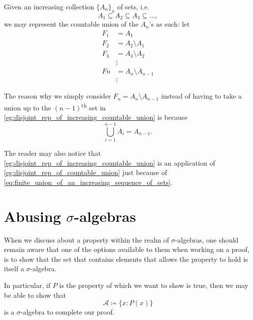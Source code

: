 \documentclass[notoc,notitlepage]{tufte-book}
\begin{document}
\begin{eg}\label{eg:disjoint_rep_of_increasing_countable_union}
  Given an increasing collection $\{ A_n \}_{n}$ of sets, i.e.
  \begin{equation*}
    A_1 \subseteq A_2 \subseteq A_3 \subseteq \hdots,
  \end{equation*}
  we may represent the countable union of the $A_n$'s as such:
  let
  \begin{align*}
    F_1 &= A_1 \\
    F_2 &= A_2 \setminus A_1 \\
    F_3 &= A_3 \setminus A_2 \\
        &\vdots \\
    Fn &= A_n \setminus A_{n-1} \\
       &\vdots
  \end{align*}
\end{eg}

\begin{remark}
  The reason why we simply consider $F_n = A_n \setminus A_{n-1}$ instead
  of having to take a union up to the $(n-1)$\textsuperscript{th}
  set in \cref{eg:disjoint_rep_of_increasing_countable_union}
  is because
  \begin{equation}\label{eq:finite_union_of_an_increasing_sequence_of_sets}
    \bigcup_{i=1}^{n-1} A_i = A_{n-1}.
  \end{equation}

  The reader may also notice that
  \cref{eg:disjoint_rep_of_increasing_countable_union}
  is an application of \cref{eg:disjoint_rep_of_countable_union}
  just because of \cref{eq:finite_union_of_an_increasing_sequence_of_sets}.
\end{remark}

\section{Abusing \texorpdfstring{$\sigma$}{sigma}-algebras}%
\label{sec:abusing_sigma_algebras}

When we discuss about a property within the realm of $\sigma$-algebras,
one should remain aware that one of the options available to them
when working on a proof, is to show that the set that contains elements
that allows the property to hold is itself a $\sigma$-algebra.

In particular, if $P$ is the property of which we want to show is true,
then we may be able to show that
\begin{equation*}
  \mathcal{A} \coloneqq \{ x : P(x) \}
\end{equation*}
is a $\sigma$-algebra to complete our proof.


\backmatter

\fancyhead[LE]{\thepage \enspace \textsl{\leftmark}}



\printindex
\end{document}
